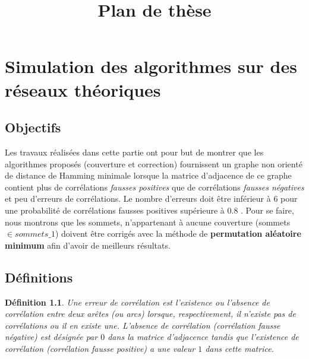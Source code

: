 \documentclass[onecolumn, 12pt]{book}
\title{Plan de th\`ese}
\date{\oldstylenums{1875}}
\newtheorem{definition}{D\'efinition}
\begin{document}
\maketitle
\tableofcontents

\chapter{Simulation des algorithmes sur des r\'eseaux th\'eoriques}

\section{Objectifs}
Les travaux r\'ealis\'ees dans cette partie ont pour but de montrer que les algorithmes propos\'es (couverture et correction) fournissent un graphe non orient\'e de distance de Hamming minimale lorsque la matrice d'adjacence de ce graphe contient plus de corr\'elations {\em fausses positives} que de corr\'elations {\em fausses n\'egatives} et peu d'erreurs de corr\'elations. Le nombre d'erreurs  doit \^etre inf\'erieur \`a $6$ pour une probabilit\'e de corr\'elations {fausses positives} sup\'erieure \`a $0.8$ . 
Pour se faire, nous montrons que les sommets, n'appartenant \`a aucune couverture (sommets $\in sommets\_1$) doivent \^etre corrig\'es avec la m\'ethode de {\bf permutation al\'eatoire minimum} afin d'avoir de meilleurs r\'esultats.

\section{D\'efinitions}
\begin{definition}
Une {\em erreur de corr\'elation} est l'existence ou l'absence de corr\'elation entre deux ar\^etes (ou arcs) lorsque, respectivement, il n'existe pas de corr\'elations ou il en existe une.
\newline
L'absence de corr\'elation (corr\'elation {\em fausse n\'egative}) est d\'esign\'ee par $0$ dans la matrice d'adjacence tandis que l'existence de corr\'elation (corr\'elation {\em fausse positive}) a une valeur $1$ dans cette matrice. 
\end{definition}
\end{document}
